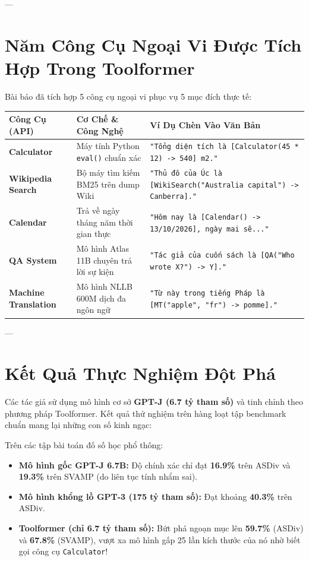 \documentclass[11pt,a4paper]{article}
\begin{document}
---

\section{Năm Công Cụ Ngoại Vi Được Tích Hợp Trong Toolformer}

Bài báo đã tích hợp 5 công cụ ngoại vi phục vụ 5 mục đích thực tế:
\begin{table}[H]
\centering
\small
\begin{tabularx}{\textwidth}{lXX}
\toprule
\textbf{Công Cụ (API)} & \textbf{Cơ Chế \& Công Nghệ} & \textbf{Ví Dụ Chèn Vào Văn Bản} \\
\midrule
\textbf{Calculator} & Máy tính Python \texttt{eval()} chuẩn xác & \texttt{"Tổng diện tích là [Calculator(45 * 12) -> 540] m2."} \\
\textbf{Wikipedia Search} & Bộ máy tìm kiếm BM25 trên dump Wiki & \texttt{"Thủ đô của Úc là [WikiSearch("Australia capital") -> Canberra]."} \\
\textbf{Calendar} & Trả về ngày tháng năm thời gian thực & \texttt{"Hôm nay là [Calendar() -> 13/10/2026], ngày mai sẽ..."} \\
\textbf{QA System} & Mô hình Atlas 11B chuyên trả lời sự kiện & \texttt{"Tác giả của cuốn sách là [QA("Who wrote X?") -> Y]."} \\
\textbf{Machine Translation} & Mô hình NLLB 600M dịch đa ngôn ngữ & \texttt{"Từ này trong tiếng Pháp là [MT("apple", "fr") -> pomme]."} \\
\bottomrule
\end{tabularx}
\end{table}

---

\section{Kết Quả Thực Nghiệm Đột Phá}

Các tác giả sử dụng mô hình cơ sở \textbf{GPT-J (6.7 tỷ tham số)} và tinh chỉnh theo phương pháp Toolformer. Kết quả thử nghiệm trên hàng loạt tập benchmark chuẩn mang lại những con số kinh ngạc:

\begin{benchmarkbox}
Trên các tập bài toán đố số học phổ thông:
\begin{itemize}[leftmargin=1.5em]
    \item \textbf{Mô hình gốc GPT-J 6.7B:} Độ chính xác chỉ đạt \textbf{16.9\%} trên ASDiv và \textbf{19.3\%} trên SVAMP (do liên tục tính nhẩm sai).
    \item \textbf{Mô hình khổng lồ GPT-3 (175 tỷ tham số):} Đạt khoảng \textbf{40.3\%} trên ASDiv.
    \item \textbf{Toolformer (chỉ 6.7 tỷ tham số):} Bứt phá ngoạn mục lên \textbf{59.7\%} (ASDiv) và \textbf{67.8\%} (SVAMP), vượt xa mô hình gấp 25 lần kích thước của nó nhờ biết gọi công cụ \texttt{Calculator}!
\end{itemize}
\end{benchmarkbox}
\end{document}
